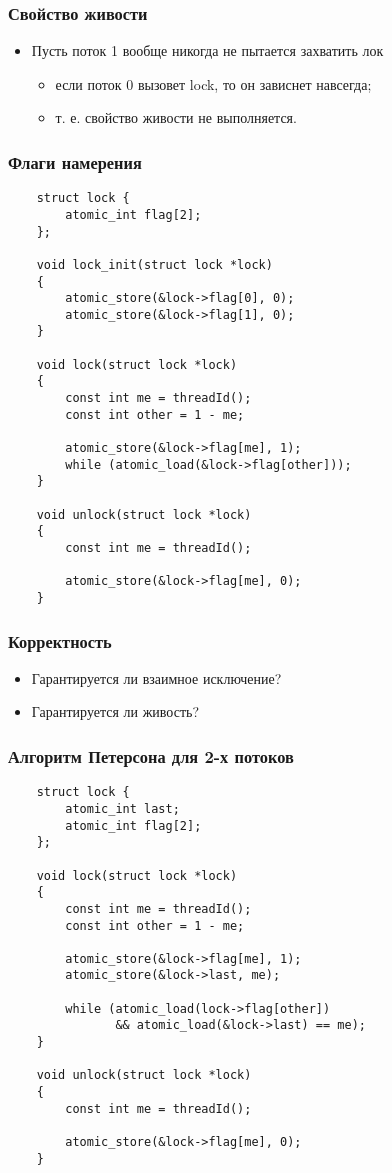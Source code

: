 \begin{frame}
\frametitle{Свойство живости}
\begin{itemize}
    \item<1->Пусть поток 1 вообще никогда не пытается захватить лок
    \begin{itemize}
        \item<2->если поток 0 вызовет lock, то он зависнет навсегда;
        \item<3->т. е. свойство живости не выполняется.
    \end{itemize}
\end{itemize}
\end{frame}

\begin{frame}[fragile]
\frametitle{Флаги намерения}
\begin{lstlisting}
    struct lock {
        atomic_int flag[2];
    };

    void lock_init(struct lock *lock)
    {
        atomic_store(&lock->flag[0], 0);
        atomic_store(&lock->flag[1], 0);
    }

    void lock(struct lock *lock)
    {
        const int me = threadId();
        const int other = 1 - me;

        atomic_store(&lock->flag[me], 1);
        while (atomic_load(&lock->flag[other]));
    }

    void unlock(struct lock *lock)
    {
        const int me = threadId();

        atomic_store(&lock->flag[me], 0);
    }
\end{lstlisting}
\end{frame}

\begin{frame}
\frametitle{Корректность}
\begin{itemize}
    \item<1->Гарантируется ли взаимное исключение?
    \item<2->Гарантируется ли живость?
\end{itemize}
\end{frame}

\begin{frame}[fragile]
\frametitle{Алгоритм Петерсона для 2-х потоков}
\begin{lstlisting}
    struct lock {
        atomic_int last;
        atomic_int flag[2];
    };

    void lock(struct lock *lock)
    {
        const int me = threadId();
        const int other = 1 - me;

        atomic_store(&lock->flag[me], 1);
        atomic_store(&lock->last, me);

        while (atomic_load(lock->flag[other])
               && atomic_load(&lock->last) == me);
    }

    void unlock(struct lock *lock)
    {
        const int me = threadId();

        atomic_store(&lock->flag[me], 0);
    }
\end{lstlisting}
\end{frame}


